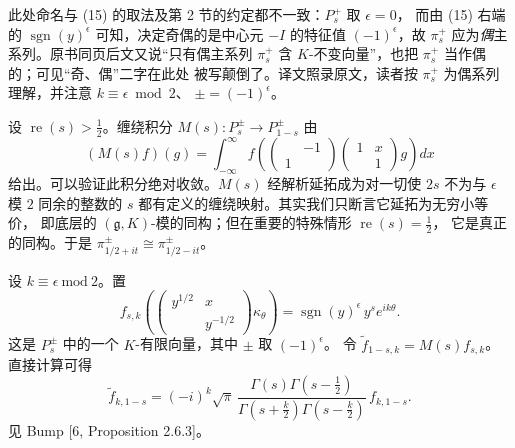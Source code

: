 \begin{annote}
此处命名与 (15) 的取法及第 2 节的约定都不一致：$P_{s}^{+}$ 取 $\epsilon=0$，
而由 (15) 右端的 $\operatorname{sgn}(y)^{\epsilon}$ 可知，决定奇偶的是中心元 $-I$ 的特征值
$(-1)^{\epsilon}$，故 $\pi_{s}^{+}$ 应为\emph{偶}主系列。原书同页后文又说“只有偶主系列
$\pi_{s}^{+}$ 含 $K$-不变向量”，也把 $\pi_{s}^{+}$ 当作偶的；可见“奇、偶”二字在此处
被写颠倒了。译文照录原文，读者按 $\pi_{s}^{+}$ 为偶系列理解，并注意 $k\equiv\epsilon\bmod2$、
$\pm=(-1)^{\epsilon}$。
\par{}
\end{annote}


设 $\operatorname{re}(s)>\tfrac12$。缠绕积分 $M(s):P_{s}^{\pm}\to P_{1-s}^{\pm}$ 由
\begin{equation}\tag{16}
(M(s)f)(g)=\int_{-\infty}^{\infty}
f\!\left(\begin{pmatrix}&-1\\1&\end{pmatrix}
\begin{pmatrix}1&x\\&1\end{pmatrix}g\right)dx
\end{equation}
给出。可以验证此积分绝对收敛。$M(s)$ 经解析延拓成为对一切使 $2s$ 不为与 $\epsilon$
模 $2$ 同余的整数的 $s$ 都有定义的缠绕映射。其实我们只断言它延拓为无穷小等价，
即底层的 $(\mathfrak{g},K)$-模的同构；但在重要的特殊情形 $\operatorname{re}(s)=\tfrac12$，
它是真正的同构。于是 $\pi_{1/2+it}^{\pm}\cong\pi_{1/2-it}^{\pm}$。

设 $k\equiv\epsilon\ \mathrm{mod}\ 2$。置
\begin{equation}\tag{17}
f_{s,k}\!\left(\begin{pmatrix}y^{1/2}&x\\&y^{-1/2}\end{pmatrix}\kappa_{\theta}\right)
=\operatorname{sgn}(y)^{\epsilon}\,y^{s}e^{ik\theta}.
\end{equation}
这是 $P_{s}^{\pm}$ 中的一个 $K$-有限向量，其中 $\pm$ 取 $(-1)^{\epsilon}$。
令 $\tilde f_{1-s,k}=M(s)f_{s,k}$。直接计算可得
\begin{equation}\tag{18}
\tilde f_{k,1-s}=(-i)^{k}\sqrt{\pi}\,
\frac{\Gamma(s)\Gamma\left(s-\frac12\right)}
{\Gamma\left(s+\frac{k}{2}\right)\Gamma\left(s-\frac{k}{2}\right)}\,f_{k,1-s}.
\end{equation}
见 Bump [6, Proposition 2.6.3]。

